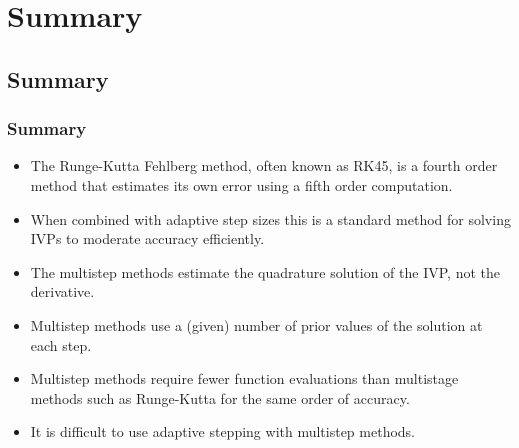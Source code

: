 \documentclass{beamer}
\begin{document}
\section{Summary}

\subsection{Summary}

\begin{frame}
  \frametitle{Summary}

  \begin{itemize}
  \item The Runge-Kutta Fehlberg method, often known as RK45, is a
    fourth order method that estimates its own error using a fifth
    order computation.
  \item When combined with adaptive step sizes this is a standard
    method for solving IVPs to moderate accuracy efficiently. %
  \item The multistep methods estimate the quadrature solution of the
    IVP, not the derivative.
  \item Multistep methods use a (given) number of prior values of the
    solution at each step.
  \item Multistep methods require fewer function evaluations than
    multistage methods such as Runge-Kutta for the same order of
    accuracy.
  \item It is difficult to use adaptive stepping with multistep
    methods.
  \end{itemize}

\end{frame}
\end{document}
